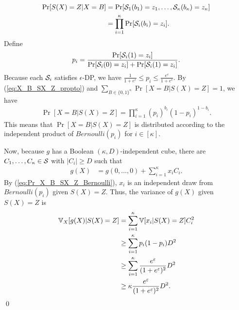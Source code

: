 {%
\begin{align*}
  \Pr[S(X)=Z|X=B] 
  &=
  \Pr[\mathcal{S}_1(b_1) = z_1, \ldots, \mathcal{S}_\kappa(b_\kappa) = z_\kappa] \\
  &= \prod_{i=1}^\kappa \Pr[\mathcal{S}_i(b_i)=z_i].
\end{align*}
Define 
\begin{align*}
    p_i = \frac{\Pr[\mathcal{S}_i(1)=z_i]}{\Pr[\mathcal{S}_i(0)=z_i] +
    \Pr[\mathcal{S}_i(1)=z_i]}.
\end{align*}
Because each $\mathcal{S}_i$ satisfies $\epsilon$-DP, we have $\frac{1}{1+e^{\epsilon}} \leq p_i \leq \frac{e^\epsilon}{1+e^\epsilon}$.
By (\ref{eq:X_B_SX_Z_propto}) and $\sum_{B \in \{0,1\}^\kappa} \Pr[X=B|S(X)=Z] = 1$, 
we have
\begin{align}
    \Pr[X=B|S(X)=Z] 
    = 
    \prod_{i=1}^\kappa (p_i)^{b_i}(1-p_i)^{1-b_i}. %
\label{eq:Pr_X_B_SX_Z_Bernoulli}
\end{align}
This means that $\Pr[X=B|S(X)=Z]$ is distributed according to the independent product of $Bernoulli(p_i)$ for $i \in [\kappa]$.

Now, because 
$g$ has 
a Boolean $(\kappa,D)$-independent cube, 
there are $C_1,
\ldots, C_\kappa \in \mathcal{S}$ with $|C_i| \geq D$ such that
\begin{align*}
g(X) &= g(0, \ldots, 0) + \sum_{i=1}^\kappa
x_iC_i.
\end{align*}
By (\ref{eq:Pr_X_B_SX_Z_Bernoulli}), 
$x_i$ 
is an independent draw from $Bernoulli(p_i)$ 
given $S(X)=Z$. 
Thus, the variance of 
$g(X)$ given $S(X)=Z$ 
is
\begin{align*}
\mathbb{V}_X[g(X)|S(X)=Z] &= \sum_{i=1}^\kappa \mathbb{V}[x_i |S(X)=Z]C_i^2 \\
&\geq \sum_{i=1}^\kappa p_i(1-p_i) D^2 \\
&\geq \sum_{i=1}^\kappa \frac{e^\varepsilon}{(1+e^\varepsilon)^2} D^2 \\
&\geq \kappa \frac{e^\varepsilon}{(1+e^\varepsilon)^2} D^2.
\end{align*}
\qed
}
% 
